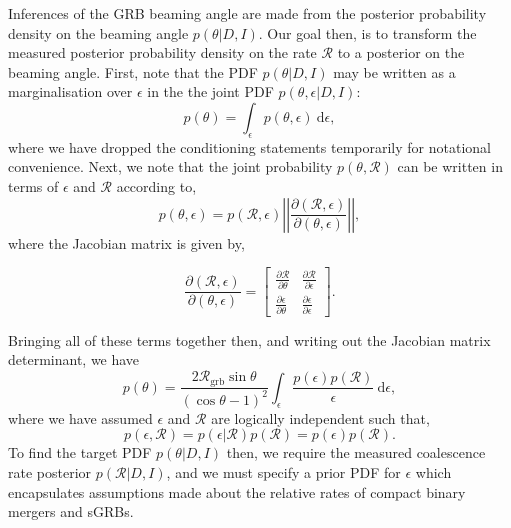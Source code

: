 \documentclass[nofootinbib]{revtex4}
\newcommand{\grbrate}{{{\mathcal R}_{\mathrm{grb}}}}
\newcommand{\cbcrate}{{{\mathcal R}}}
\newcommand{\diff}{{\mathrm d}}
\begin{document}
Inferences of the GRB beaming angle are made from the posterior probability
density on the beaming angle $p(\theta|D,I)$.  Our goal then, is to transform
the measured posterior probability density on the rate $\cbcrate$ to a posterior
on the beaming angle.
%
First, note that the PDF $p(\theta|D,I)$ may be written as a marginalisation
over $\epsilon$ in the the joint PDF $p(\theta, \epsilon|D,I)$:
%
\begin{equation}
p(\theta) = \int_{\epsilon} p(\theta,\epsilon)~\diff \epsilon,
\end{equation}
%
where we have dropped the conditioning statements temporarily for notational
convenience.  Next, we note that the joint probability $p(\theta,\cbcrate)$ can
be written in terms of $\epsilon$ and $\cbcrate$ according to,
%
\begin{equation}
p(\theta,\epsilon) = p(\cbcrate,\epsilon)
\left\lvert\left\lvert
\frac{\partial(\cbcrate,\epsilon)}{\partial(\theta,\epsilon)}
\right\rvert\right\rvert,
\end{equation}
%
where the Jacobian matrix is given by,
\begingroup
\renewcommand*{\arraystretch}{1.5}

\begin{equation}
\frac{\partial (\cbcrate,\epsilon)}{\partial(\theta,\epsilon)} =
\begin{bmatrix}
\frac{\partial \cbcrate}{\partial \theta} & \frac{\partial \cbcrate}{\partial \epsilon} \\
\frac{\partial \epsilon}{\partial \theta} & \frac{\partial \epsilon}{\partial \epsilon}
\end{bmatrix}.
\end{equation}

\endgroup
Bringing all of these terms together then, and writing out the Jacobian matrix
determinant, we have
%
\begin{equation}\label{eq:marginaltheta}
p(\theta) = \frac{2\grbrate \sin
\theta}{(\cos\theta-1)^2}\int_{\epsilon} \frac{p(\epsilon)p(\cbcrate)}{\epsilon} ~\diff
\epsilon,
\end{equation}
%
where we have assumed $\epsilon$ and $\cbcrate$ are logically independent such
that,
\begin{equation}
p(\epsilon,\cbcrate) = p(\epsilon|\cbcrate)p(\cbcrate) = p(\epsilon)p(\cbcrate).
\end{equation}
%
%
To find the target PDF $p(\theta|D,I)$ then, we require the measured coalescence
rate posterior $p(\cbcrate|D,I)$, and we must specify a prior PDF for $\epsilon$
which encapsulates assumptions made about the relative rates of compact binary
mergers and sGRBs.
 
\end{document}
